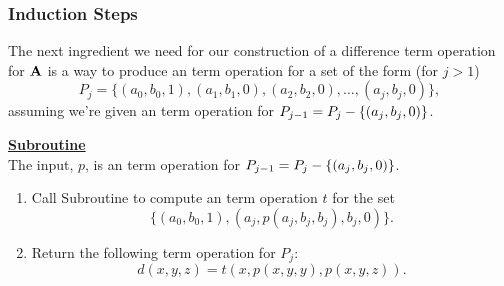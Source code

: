 \begin{comment}
\medskip
\noindent \underline{\textbf{Subroutine \ld-2'}}\\[4pt]
To compute an \ld term operation for
$\{(a_0,b_0,1), (a_1, b_1, 0)\}$, obviously this is symmetric to
the situation handled in Subroutine LD2 and so the general algorithm
is the same.  Nonetheless, we include a listing of the computational 
steps required so that later we can easily refer to this special case 
of the general algorithm.
\begin{enumerate}
\item Compute $\delta_1=\com{\theta_1}$;
\item form $C_1= \{b_0\}\times a_1/\delta_1 \leq \alg{A}\times\alg{A}$;
\item compute
      $S_1=\Sg^{\alg{A}\times \alg{A}} \{(a_0,a_1),(a_0,b_1),(b_0,b_1)\}$;
\item find a term operation $t$ of $\alg{A}$ satisfying
\[t^{\alg{A}\times\alg{A}}((a_0,a_1),(a_0,b_1),(b_0,b_1)) =
 (t^{\alg{A}}(a_0,a_0,b_0), t^{\alg{A}}(a_1,b_1,b_1)) \in C_1 \cap S_1.\]
\end{enumerate}
Then $t$ is an \ld term operation for
$\{(a_0, b_0, 1), (a_1, b_1, 0)\}$.
\end{comment}

\subsubsection{Induction Steps}
\label{sec:induct}

The next ingredient we need for our construction of a 
difference term operation for $\mathbf{A}$ 
is 
a way to produce an \ld
term operation for a set of the form  (for $j>1$)
\begin{equation*}
P_j = \{(a_0, b_0, 1), (a_1, b_1, 0), (a_2, b_2, 0), \dots, 
(a_j, b_j, 0)\},
\end{equation*}
assuming we're given an \ld term operation for $P_{j-1} = P_{j} - \{(a_j, b_j, 0)\}$.  

\smallskip

\noindent \underline{\bf Subroutine }\\[4pt]
The input, $p$,  is
an \ld term operation for $P_{j-1} = P_{j} - \{(a_j, b_j, 0)\}$.  
\begin{enumerate}[1.]
\item 
Call Subroutine  to 
compute an \ld term operation $t$ for the set
\begin{equation*}
\{(a_0, b_0, 1), (a_j, p(a_j, b_j, b_j), b_j, 0)\}.
\end{equation*}
\item Return the following 
\ld term operation for $P_j$: 
\begin{equation*}
d(x,y,z) = t(x, p(x,y,y), p(x,y,z)).
\end{equation*}
\end{enumerate}

